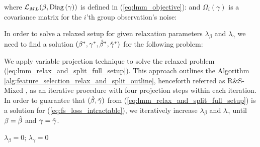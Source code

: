 \documentclass[11pt,letterpaper]{article}
\newcommand{\ouralgo}{R\&S-Mixed }
\numberwithin{equation}{section} %
\numberwithin{figure}{section} %
\numberwithin{table}{section} %
\begin{document}
where $\operatorname{\mathcal{L}}_{ML}(\beta, \operatorname{Diag}{(\gamma)})$ is defined in (\ref{eq:lmm_objective}):
and $\Omega_i(\gamma)$ is a covariance matrix for the $i$'th group observation's noise:

In order to solve a relaxed setup for given relaxation parameters $\lambda_\beta$ and $\lambda_\gamma$ we need to find a solution $(\beta^*, \gamma^*, \hat\beta^*, \hat\gamma^*)$ for the following problem:



We apply variable projection technique to solve the relaxed problem (\ref{eq:lmm_relax_and_split_full_setup}). This approach outlines the Algorithm \ref{alg:feature_selection_relax_and_split_outline}, henceforth referred as \ouralgo,  as an iterative procedure with four projection steps within each iteration. In order to guarantee that $(\hat\beta, \hat\gamma)$ from (\ref{eq:lmm_relax_and_split_full_setup}) is a solution for (\ref{eq:fs_loss_intractable}), we iteratively increase $\lambda_\beta$ and $\lambda_\gamma$ until $\beta=\hat\beta$ and $\gamma=\hat\gamma$. 


\begin{algorithm}
	$\lambda_\beta = 0$; $\lambda_\gamma = 0$ \\
	\BlankLine
\caption{\label{alg:feature_selection_relax_and_split_outline}\ouralgo: Relax-and-Split-based feature selection algorithm for linear mixed-effects models.}	
\end{algorithm}
\end{document}
